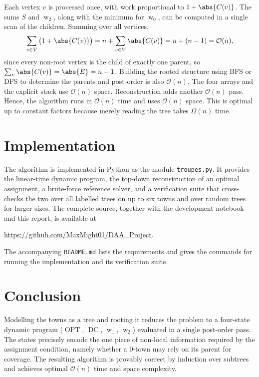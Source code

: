 \documentclass[11pt, a4paper]{article}
\newcommand{\OPT}{\operatorname{OPT}}
\newcommand{\DC}{\operatorname{DC}}
\newcommand{\with}[1]{\operatorname{w}_{#1}}  %
\theoremstyle{plain}
\theoremstyle{definition}
\begin{document}
Each vertex $v$ is processed once, with work proportional to $1 + \abs{C(v)}$. The
sums $S$ and $\with{2}$, along with the minimum for $\with{0}$, can be computed in
a single scan of the children. Summing over all vertices,
\[
    \sum_{v \in V} \big(1 + \abs{C(v)}\big)
    = n + \sum_{v\in V}\abs{C(v)}
    = n + (n - 1)
    = \mathcal{O}(n),
\]
since every non-root vertex is the child of exactly one parent, so
$\sum_v \abs{C(v)} = \abs{E} = n-1$. Building the rooted structure using BFS or
DFS to determine the parents and post-order is also $\mathcal{O}(n)$. The four
arrays and the explicit stack use $\mathcal{O}(n)$ space. Reconstruction adds
another $\mathcal{O}(n)$ pass. Hence, the algorithm runs in $\mathcal{O}(n)$ time
and uses $\mathcal{O}(n)$ space. This is optimal up to constant factors because
merely reading the tree takes $\Omega(n)$ time.

\section{Implementation}

The algorithm is implemented in Python as the module \texttt{troupes.py}. It
provides the linear-time dynamic program, the top-down reconstruction of an
optimal assignment, a brute-force reference solver, and a verification suite that
cross-checks the two over all labelled trees on up to six towns and over random
trees for larger sizes. The complete source, together with the development
notebook and this report, is available at
\begin{center}
\url{https://github.com/MaxMight01/DAA_Project}.
\end{center}
The accompanying \texttt{README.md} lists the requirements and gives the commands
for running the implementation and its verification suite.

\section{Conclusion}

Modelling the towns as a tree and rooting it reduces the problem to a four-state
dynamic program ($\OPT$, $\DC$, $\with{1}$, $\with{2}$) evaluated in a single
post-order pass. The states precisely encode the one piece of non-local
information required by the assignment condition, namely whether a $0$-town may
rely on its parent for coverage. The resulting algorithm is provably correct by
induction over subtrees and achieves optimal $\mathcal{O}(n)$ time and space
complexity.
\end{document}
